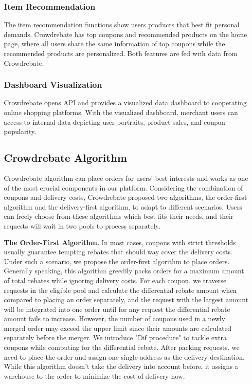 \subsubsection{Item Recommendation}

The item recommendation functions show users products that best fit personal demands. Crowdrebate has top coupons and recommended products on the home page, where all users share the same information of top coupons while the recommended products are personalized. Both features are fed with data from Crowdrebate.

\subsubsection{Dashboard Visualization}

Crowdrebate opens API and provides a visualized data dashboard to cooperating online shopping platforms. With the visualized dashboard, merchant users can access to internal data depicting user portraits, product sales, and coupon popularity.

\subsection{Crowdrebate Algorithm}

Crowdrebate algorithm can place orders for users' best interests and works as one of the most crucial components in our platform. Considering the combination of coupons and delivery costs, Crowdrebate proposed two algorithms, the order-first algorithm and the delivery-first algorithm, to adapt to different scenarios. Users can freely choose from these algorithms which best fits their needs, and their requests will wait in two pools to process separately.

\textbf{The Order-First Algorithm.} In most cases, coupons with strict thresholds usually guarantee tempting rebates that should way cover the delivery costs. Under such a scenario, we propose the order-first algorithm to place orders. Generally speaking, this algorithm greedily packs orders for a maximum amount of total rebates while ignoring delivery costs. For each coupon, we traverse requests in the eligible pool and calculate the differential rebate amount when compared to placing an order separately, and the request with the largest amount will be integrated into one order until for any request the differential rebate amount fails to increase. However, the number of coupons used in a newly merged order may exceed the upper limit since their amounts are calculated separately before the merger. We introduce "Dif procedure" to tackle extra coupons while computing for the differential rebate. After packing requests, we need to place the order and assign one single address as the delivery destination. While this algorithm doesn't take the delivery into account before, it assigns a warehouse to the order to minimize the cost of delivery now.

